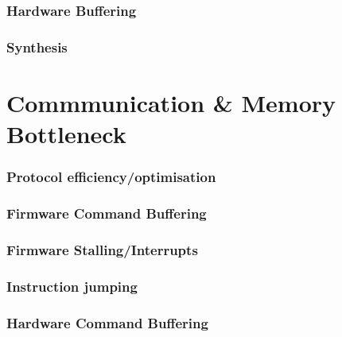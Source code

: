 \documentclass[a4paper,8pt]{report}
\begin{document}
\subsection{Hardware Buffering}

\subsection{Synthesis}



\chapter{Commmunication \& Memory Bottleneck}
\subsection{Protocol efficiency/optimisation}



\subsection{Firmware Command Buffering}


\subsection{Firmware Stalling/Interrupts}
\subsection{Instruction jumping}

\subsection{Hardware Command Buffering}
\end{document}
